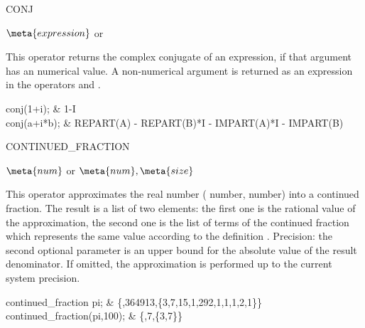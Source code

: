\begin{Operator}{CONJ}

\begin{Syntax}
\(\meta{expression}\) or  
\end{Syntax}
This operator returns the complex conjugate of an expression, if that
argument has an numerical value.  A non-numerical argument is returned as
an expression in the operators  and .

\begin{Examples}
conj(1+i); & 1-I \\
conj(a+i*b); & REPART(A) - REPART(B)*I - IMPART(A)*I - IMPART(B)
\end{Examples}

\end{Operator}

\begin{Operator}{CONTINUED_FRACTION}

\begin{Syntax}
\(\meta{num}\) 
or \( \meta{num},\meta{size}\)
\end{Syntax}
This operator approximates the real number 
(  number,  number)
into a continued fraction. The result is a list of two elements: the
first one is the rational value of the approximation, the second one
is the list of terms of the continued fraction which represents the
same value according to the definition .
Precision: the second optional parameter  is an upper bound
for the absolute value of the result denominator. If omitted, the
approximation is performed up to the current system precision.


\begin{Examples}
continued_fraction pi;
 & \{,{364913},\{3,7,15,1,292,1,1,1,2,1\}\} \\
continued_fraction(pi,100);
 & \{,{7},\{3,7\}\} \\
\end{Examples}

\end{Operator}

